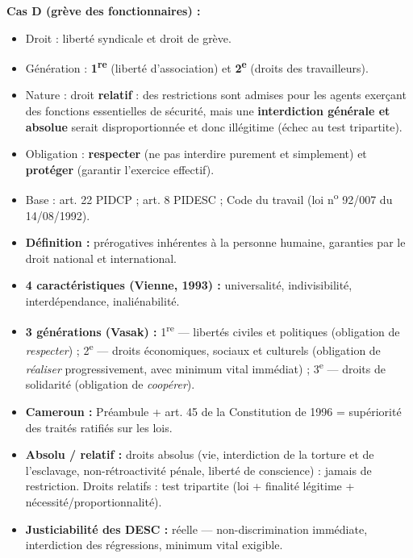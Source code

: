 \documentclass[11pt]{article}
\begin{document}
\begin{corrige}
\textbf{Cas D (grève des fonctionnaires) :}
\begin{itemize}
    \item Droit : liberté syndicale et droit de grève.
    \item Génération : \textbf{1\textsuperscript{re}} (liberté d'association) et \textbf{2\textsuperscript{e}} (droits des travailleurs).
    \item Nature : droit \textbf{relatif} : des restrictions sont admises pour les agents exerçant des fonctions essentielles de sécurité, mais une \textbf{interdiction générale et absolue} serait disproportionnée et donc illégitime (échec au test tripartite).
    \item Obligation : \textbf{respecter} (ne pas interdire purement et simplement) et \textbf{protéger} (garantir l'exercice effectif).
    \item Base : art. 22 PIDCP ; art. 8 PIDESC ; Code du travail (loi n\textsuperscript{o} 92/007 du 14/08/1992).
\end{itemize}
\end{corrige}

\begin{aretenir}
\begin{itemize}
    \item \textbf{Définition :} prérogatives inhérentes à la personne humaine, garanties par le droit national et international.
    \item \textbf{4 caractéristiques (Vienne, 1993) :} universalité, indivisibilité, interdépendance, inaliénabilité.
    \item \textbf{3 générations (Vasak) :} 1\textsuperscript{re} — libertés civiles et politiques (obligation de \emph{respecter}) ; 2\textsuperscript{e} — droits économiques, sociaux et culturels (obligation de \emph{réaliser} progressivement, avec minimum vital immédiat) ; 3\textsuperscript{e} — droits de solidarité (obligation de \emph{coopérer}).
    \item \textbf{Cameroun :} Préambule + art. 45 de la Constitution de 1996 = supériorité des traités ratifiés sur les lois.
    \item \textbf{Absolu / relatif :} droits absolus (vie, interdiction de la torture et de l'esclavage, non-rétroactivité pénale, liberté de conscience) : jamais de restriction. Droits relatifs : test tripartite (loi + finalité légitime + nécessité/proportionnalité).
    \item \textbf{Justiciabilité des DESC :} réelle — non-discrimination immédiate, interdiction des régressions, minimum vital exigible.
\end{itemize}
\end{aretenir}
\end{document}
